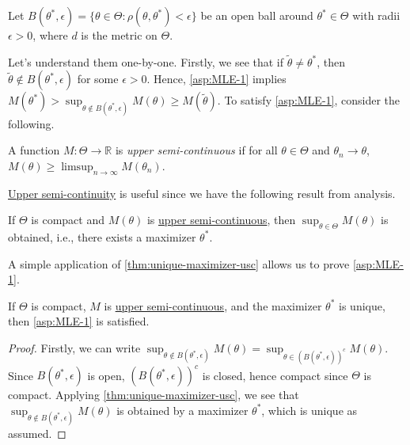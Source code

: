 \begin{notation}
	Let \(B(\theta ^{\ast} , \epsilon ) = \{ \theta \in \Theta \colon \rho (\theta , \theta ^{\ast} ) < \epsilon \} \) be an open ball around \(\theta ^{\ast} \in \Theta \) with radii \(\epsilon > 0\), where \(d\) is the metric on \(\Theta \).
\end{notation}

Let's understand them one-by-one. Firstly, we see that if \(\widetilde{\theta} \neq \theta ^{\ast} \), then \(\widetilde{\theta} \notin B(\theta ^{\ast} , \epsilon )\) for some \(\epsilon > 0\). Hence, \autoref{asp:MLE-1} implies \(M(\theta ^{\ast} ) > \sup _{\theta \notin B(\theta ^{\ast} , \epsilon )} M(\theta ) \geq M(\widetilde{\theta} )\). To satisfy \autoref{asp:MLE-1}, consider the following.

\begin{definition}\label{def:upper-semi-continuous}
	A function \(M\colon \Theta \to \mathbb{R} \) is \emph{upper semi-continuous} if for all \(\theta \in \Theta \) and \(\theta _n \to \theta \), \(M(\theta ) \geq \limsup_{n \to \infty} M(\theta _n)\).
\end{definition}

\hyperref[def:upper-semi-continuous]{Upper semi-continuity} is useful since we have the following result from analysis.

\begin{theorem}\label{thm:unique-maximizer-usc}
	If \(\Theta \) is compact and \(M(\theta )\) is \hyperref[def:upper-semi-continuous]{upper semi-continuous}, then \(\sup _{\theta \in \Theta } M(\theta )\) is obtained, i.e., there exists a maximizer \(\theta ^{\ast} \).
\end{theorem}

A simple application of \autoref{thm:unique-maximizer-usc} allows us to prove \autoref{asp:MLE-1}.

\begin{corollary}\label{col:asp:MLE-1}
	If \(\Theta \) is compact, \(M\) is \hyperref[def:upper-semi-continuous]{upper semi-continuous}, and the maximizer \(\theta ^{\ast} \) is unique, then \autoref{asp:MLE-1} is satisfied.
\end{corollary}
\begin{proof}
	Firstly, we can write \(\sup _{\theta \notin B(\theta ^{\ast} , \epsilon )} M(\theta ) = \sup _{\theta \in (B(\theta ^{\ast} , \epsilon ))^{c} } M(\theta ) \). Since \(B(\theta ^{\ast} , \epsilon )\) is open, \((B(\theta ^{\ast} , \epsilon ))^{c} \) is closed, hence compact since \(\Theta \) is compact. Applying \autoref{thm:unique-maximizer-usc}, we see that \(\sup _{\theta \notin B(\theta ^{\ast} , \epsilon )} M(\theta )\) is obtained by a maximizer \(\theta ^{\ast} \), which is unique as assumed.
\end{proof}

